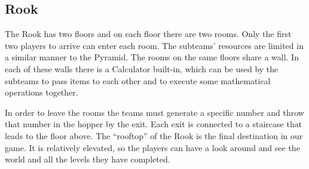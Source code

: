 \subsection{Rook}
The Rook has two floors and on each floor there are two rooms. Only the first two players to arrive can enter each room. The subteams’ resources are limited in a similar manner to the Pyramid. The rooms on the same floors share a wall. In each of these walls there is a Calculator built-in, which can be used by the subteams to pass items to each other and to execute some mathematical operations together.

In order to leave the rooms the teams must generate a specific number and throw that number in the hopper by the exit. Each exit is connected to a staircase that leads to the floor above. The ``rooftop'' of the Rook is the final destination in our game. It is relatively elevated, so the players can have a look around and see the world and all the levels they have completed.
